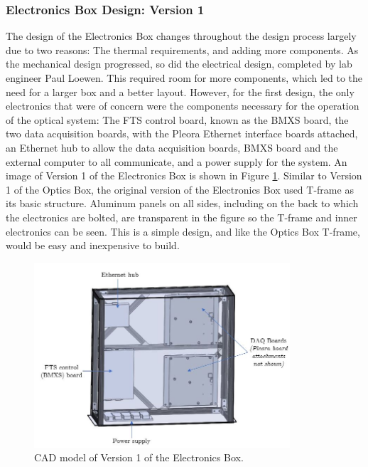 \subsubsection{Electronics Box Design: Version 1}
The design of the Electronics Box changes throughout the design process largely due to two reasons: The thermal requirements, and adding more components. As the mechanical design progressed, so did the electrical design, completed by lab engineer Paul Loewen. This required room for more components, which led to the need for a larger box and a better layout. However, for the first design, the only electronics that were of concern were the components necessary for the operation of the optical system: The FTS control board, known as the BMXS board, the two data acquisition boards, with the Pleora Ethernet interface boards attached, an Ethernet hub to allow the data acquisition boards, BMXS board and the external computer to all communicate, and a power supply for the system. An image of Version 1 of the Electronics Box is shown in Figure \ref{fig:Ebox_V1}. Similar to Version 1 of the Optics Box, the original version of the Electronics Box used T-frame as its basic structure. Aluminum panels on all sides, including on the back to which the electronics are bolted, are transparent in the figure so the T-frame and inner electronics can be seen. This is a simple design, and like the Optics Box T-frame, would be easy and inexpensive to build.

\begin{figure}
    \centering
    \includegraphics[width=0.85\textwidth]{chap3_images/LIFE_V1_images/Ebox_V1_labelled.JPG}
    \caption{CAD model of Version 1 of the Electronics Box.}
    \label{fig:Ebox_V1}
\end{figure}

